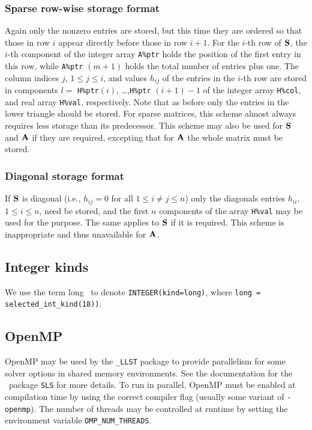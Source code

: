 \documentclass{galahad}
\newcommand{\packagename}{LLST}
\newcommand{\fullpackagename}{\libraryname\_\packagename}
\begin{document}
\subsubsection{Sparse row-wise storage format}\label{rowwise}
Again only the nonzero entries are stored, but this time
they are ordered so that those in row $i$ appear directly before those
in row $i+1$. For the $i$-th row of ${\mathbf{S}}$, the $i$-th component of the
integer array {\tt A\%ptr} holds the position of the first entry in this row,
while {\tt A\%ptr} $(m+1)$ holds the total number of entries plus one.
The column indices $j$, $1 \leq j \leq i$, and values $h_{ij}$ of the 
entries in the $i$-th row are stored in components 
$l =$ {\tt H\%ptr}$(i)$, \ldots ,{\tt H\%ptr} $(i+1)-1$ of the 
integer array {\tt H\%col}, and real array {\tt H\%val}, respectively. 
Note that as before only the entries in the lower triangle should be stored.
For sparse matrices, this scheme almost always requires less storage than 
its predecessor. 
This scheme may also be used for ${\mathbf{S}}$ and ${\mathbf{A}}$ if they are required,
excepting that for ${\mathbf{A}}$ the whole matrix must be stored.

\subsubsection{Diagonal storage format}\label{diagonal}
If ${\mathbf{S}}$ is diagonal (i.e., $h_{ij} = 0$ for all $1 \leq i \neq j \leq n$)
only the diagonals entries $h_{ii}$, $1 \leq i \leq n$,  need be stored,
and the first $n$ components of the array {\tt H\%val} may be used for 
the purpose. The same applies to ${\mathbf{S}}$ if it is required. 
This scheme is inappropriate and thus unavailable for ${\mathbf{A}}$.

\subsection{Integer kinds}\label{Integer kinds}
We use the term
long \integer\ to denote {\tt INTEGER\-(kind=long)}, where 
{\tt long = selected\_int\_kind(18))}.


\subsection{OpenMP}
OpenMP may be used by the {\tt \fullpackagename} package to provide 
parallelism for some solver options in shared memory environments.  
See the documentation for the \galahad\ package {\tt SLS} for more details.
To run in parallel, OpenMP 
must be enabled at compilation time by using the correct compiler flag 
(usually some variant of {\tt -openmp}). 
The number of threads may be controlled at runtime
by setting the environment variable {\tt OMP\_NUM\_THREADS}.
\end{document}
